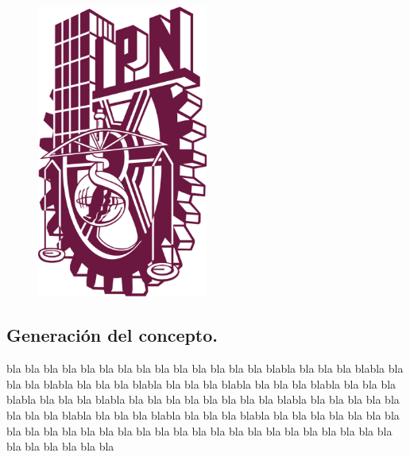 \documentclass[11pt,letter]{report}
\begin{document}
\begin{figure}[H]
	\begin{center}
 		\includegraphics[width = 0.5\textwidth]{images/ipn.png}
	\end{center} 
\end{figure}



\subsection{Generación del concepto.}

bla bla bla bla bla bla bla bla bla bla bla bla bla bla blabla bla bla bla blabla bla bla bla blabla bla bla bla blabla bla bla bla blabla bla bla bla blabla bla bla bla blabla bla bla bla blabla bla bla bla bla bla bla bla bla blabla bla bla bla bla bla bla bla bla blabla bla bla bla blabla bla bla bla blabla bla bla bla bla bla bla bla bla bla bla bla bla bla bla bla bla bla bla bla bla bla bla bla bla bla bla bla bla bla bla bla bla bla bla
\end{document}
